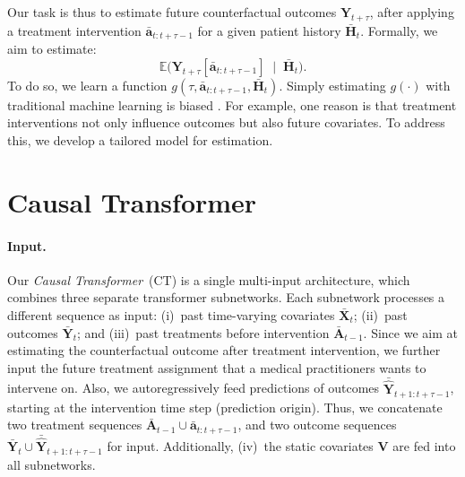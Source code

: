 \documentclass{article}
\theoremstyle{plain}
\theoremstyle{definition}
\theoremstyle{remark}
\newcommand{\longname}{\emph{Causal Transformer}\xspace}
\newcommand{\shortname}{CT\xspace}
\begin{document}


Our task is thus to estimate future counterfactual outcomes $\mathbf{Y}_{t + \tau}$, after applying a treatment intervention $\bar{\mathbf{a}}_{t: t+\tau-1}$ for a given patient history $\bar{\mathbf{H}}_{t}$. Formally, we aim to estimate:
\begin{equation}
    \label{eq:estimand}
     \mathbb{E} \big( \mathbf{Y}_{t + \tau}[\bar{\mathbf{a}}_{t: t+\tau-1}] \;\mid\; \bar{\mathbf{H}}_{t} \big) .
\end{equation} 
To do so, we learn a function $g(\tau, \bar{\mathbf{a}}_{t: t+\tau-1}, \bar{\mathbf{H}}_{t})$. Simply estimating $g(\cdot)$ with traditional machine learning is biased \cite{robins2009estimation}. For example, one reason is that treatment interventions not only influence outcomes but also future covariates. To address this, we develop a tailored model for estimation.



\section{Causal Transformer}

\paragraph{Input.} 

Our \longname~(\shortname) is a single multi-input architecture, which combines three separate transformer subnetworks. Each subnetwork processes a different sequence as input: (i)~past time-varying covariates $\bar{\mathbf{X}}_{t}$; (ii)~past outcomes $\bar{\mathbf{Y}}_{t}$; and (iii)~past treatments before intervention $\bar{\mathbf{A}}_{t-1}$. Since we aim at estimating the counterfactual outcome after treatment intervention, we further input the future treatment assignment that a medical practitioners wants to intervene on. Also, we autoregressively feed predictions of outcomes  $\bar{\hat{\mathbf{Y}}}_{t+1:t+\tau-1}$, starting at the intervention time step (prediction origin). Thus, we concatenate two treatment sequences $\bar{\mathbf{A}}_{t-1} \cup \bar{\mathbf{a}}_{t: t+\tau-1}$, and two outcome sequences $\bar{\mathbf{Y}}_{t} \cup \bar{\hat{\mathbf{Y}}}_{t+1:t+\tau-1}$ for input. Additionally, (iv)~the static covariates $\mathbf{V}$ are fed into all subnetworks.
\end{document}
